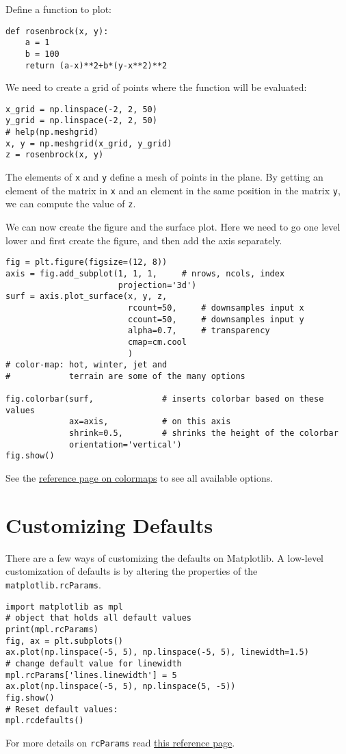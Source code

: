 \documentclass[12pt, a4paper]{article}
\begin{document}
Define a function to plot:
\lstset{language=jupyter-python,label= ,caption= ,captionpos=b,numbers=none}
\begin{lstlisting}
def rosenbrock(x, y):
    a = 1
    b = 100
    return (a-x)**2+b*(y-x**2)**2
\end{lstlisting}

We need to create a grid of points where the function will be evaluated:
\lstset{language=jupyter-python,label= ,caption= ,captionpos=b,numbers=none}
\begin{lstlisting}
x_grid = np.linspace(-2, 2, 50)
y_grid = np.linspace(-2, 2, 50)
# help(np.meshgrid)
x, y = np.meshgrid(x_grid, y_grid)
z = rosenbrock(x, y)
\end{lstlisting}
The elements of \texttt{x} and \texttt{y} define a mesh of points in the plane.
By getting an element of the matrix in \texttt{x} and an element in the same position in the matrix \texttt{y}, we can compute the value of \texttt{z}.

We can now create the figure and the surface plot.
Here we need to go one level lower and first create the figure, and then add the axis separately.
\lstset{language=jupyter-python,label= ,caption= ,captionpos=b,numbers=none}
\begin{lstlisting}
fig = plt.figure(figsize=(12, 8))
axis = fig.add_subplot(1, 1, 1,     # nrows, ncols, index
                       projection='3d')
surf = axis.plot_surface(x, y, z,
                         rcount=50,     # downsamples input x
                         ccount=50,     # downsamples input y
                         alpha=0.7,     # transparency
                         cmap=cm.cool
                         )
# color-map: hot, winter, jet and
#            terrain are some of the many options

fig.colorbar(surf,              # inserts colorbar based on these values
             ax=axis,           # on this axis
             shrink=0.5,        # shrinks the height of the colorbar
             orientation='vertical')
fig.show()
\end{lstlisting}
See the \href{https://matplotlib.org/tutorials/colors/colormaps.html}{reference page on colormaps} to see all available options.
\section{Customizing Defaults}
\label{sec:org1c32678}
There are a few ways of customizing the defaults on Matplotlib.
A low-level customization of defaults is by altering the properties of the \texttt{matplotlib.rcParams}.
\lstset{language=jupyter-python,label= ,caption= ,captionpos=b,numbers=none}
\begin{lstlisting}
import matplotlib as mpl
# object that holds all default values
print(mpl.rcParams)
fig, ax = plt.subplots()
ax.plot(np.linspace(-5, 5), np.linspace(-5, 5), linewidth=1.5)
# change default value for linewidth
mpl.rcParams['lines.linewidth'] = 5
ax.plot(np.linspace(-5, 5), np.linspace(5, -5))
fig.show()
# Reset default values:
mpl.rcdefaults()
\end{lstlisting}
For more details on \texttt{rcParams} read \href{https://matplotlib.org/users/customizing.html\#matplotlib-rcparams}{this reference page}.
\end{document}
